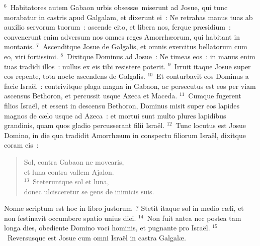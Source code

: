 ${}^{6}$~Habitatores autem Gabaon urbis obsess\ae\ miserunt ad Josue, qui tunc morabatur in castris apud Galgalam, et dixerunt ei~: Ne retrahas manus tuas ab auxilio servorum tuorum~: ascende cito, et libera nos, ferque pr\ae sidium~: convenerunt enim adversum nos omnes reges Amorrh\ae orum, qui habitant in montanis.
${}^{7}$~Ascenditque Josue de Galgalis, et omnis exercitus bellatorum cum eo, viri fortissimi.
${}^{8}$~Dixitque Dominus ad Josue~: Ne timeas eos~: in manus enim tuas tradidi illos~: nullus ex eis tibi resistere poterit.
${}^{9}$~Irruit itaque Josue super eos repente, tota nocte ascendens de Galgalis.
${}^{10}$~Et conturbavit eos Dominus a facie Isra\"el~: contrivitque plaga magna in Gabaon, ac persecutus est eos per viam ascensus Bethoron, et percussit usque Azeca et Maceda.
${}^{11}$~Cumque fugerent filios Isra\"el, et essent in descensu Bethoron, Dominus misit super eos lapides magnos de c\ae lo usque ad Azeca~: et mortui sunt multo plures lapidibus grandinis, quam quos gladio percusserant filii Isra\"el.
${}^{12}$~Tunc locutus est Josue Domino, in die qua tradidit Amorrh\ae um in conspectu filiorum Isra\"el, dixitque coram eis~: \begin{verse}Sol, contra Gabaon ne movearis,\\ et luna contra vallem Ajalon.\\
${}^{13}$~Steteruntque sol et luna,\\ donec ulcisceretur se gens de inimicis suis.\end{verse}

 Nonne scriptum est hoc in libro justorum~? Stetit itaque sol in medio c\ae li, et non festinavit occumbere spatio unius diei.
${}^{14}$~Non fuit antea nec postea tam longa dies, obediente Domino voci hominis, et pugnante pro Isra\"el.
${}^{15}$~Reversusque est Josue cum omni Isra\"el in castra Galgal\ae .


